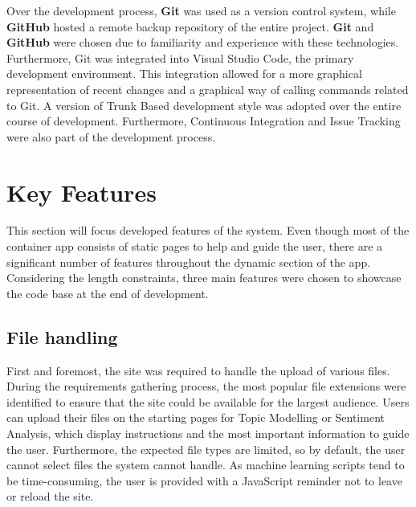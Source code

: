 \documentclass{l4proj}
\begin{document}


Over the development process, \textbf{Git} was used as a version control system, while \textbf{GitHub} hosted a remote backup repository of the entire project. \textbf{Git} and \textbf{GitHub} were chosen due to familiarity and experience with these technologies. Furthermore, Git was integrated into Visual Studio Code, the primary development environment. This integration allowed for a more graphical representation of recent changes and a graphical way of calling commands related to Git. A version of Trunk Based development style was adopted over the entire course of development. Furthermore, Continuous Integration and Issue Tracking were also part of the development process.

\section{Key Features}
This section will focus developed features of the system. Even though most of the container app consists of static pages to help and guide the user, there are a significant number of features throughout the dynamic section of the app. Considering the length constraints, three main features were chosen to showcase the code base at the end of development.

\subsection{File handling}
First and foremost, the site was required to handle the upload of various files. During the requirements gathering process, the most popular file extensions were identified to ensure that the site could be available for the largest audience. Users can upload their files on the starting pages for Topic Modelling or Sentiment Analysis, which display instructions and the most important information to guide the user. Furthermore, the expected file types are limited, so by default, the user cannot select files the system cannot handle. As machine learning scripts tend to be time-consuming, the user is provided with a JavaScript reminder not to leave or reload the site. 
\end{document}
